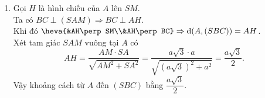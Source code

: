 \begin{bt}
{\begin{enumerate}
		\item Gọi $H$ là hình chiếu của $A$ lên $SM$.\\
		Ta có $BC\perp (SAM)\Rightarrow BC\perp AH$.\\
		Khi đó $\heva{&AH\perp SM\\&AH\perp BC}\Rightarrow \mathrm{d}(A,(SBC))=AH$.\\
		Xét tam giác $SAM$ vuông tại $A$ có
		$$AH=\dfrac{AM\cdot SA}{\sqrt{AM^2+SA^2}}=\dfrac{a\sqrt{3}\cdot a}{\sqrt{(a\sqrt{3})^2+a^2}}=\dfrac{a\sqrt{3}}{2}.$$
		Vậy khoảng cách từ $A$ đến $(SBC)$ bằng $\dfrac{a\sqrt{3}}{2}$.
	\end{enumerate}
}
\end{bt}

\begin{bt}%


\end{bt}
